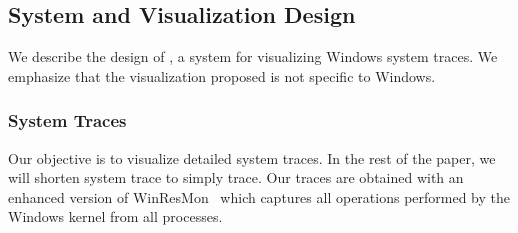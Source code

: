 \subsection{System and Visualization Design}


We describe the design of \lviz{}, a system for visualizing Windows system
traces.
We emphasize that the visualization proposed
is not specific to Windows.

\subsubsection{System Traces}
\label{sec:systrace}

Our objective is to visualize detailed system traces.
In the rest of the paper, we will shorten system trace to simply trace.
Our traces are obtained with an enhanced version of
WinResMon~\cite{winresmon} which
captures all operations performed by the Windows kernel
from all processes.

